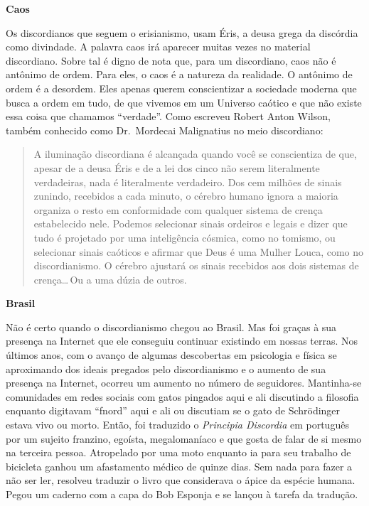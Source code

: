 \newpage
\begin{flushleft}
{\Large \textbf{Caos}}
\end{flushleft}

Os discordianos que seguem o erisianismo, usam Éris, a deusa grega da discórdia como divindade. A palavra caos irá aparecer muitas vezes no material discordiano. Sobre tal é dig\-no de nota que, para um discordiano, caos não é antônimo de ordem. Para eles, o caos é a natureza da realidade. O antônimo de ordem é a desordem. Eles apenas querem conscientizar a sociedade moderna que busca a ordem em tudo, de que vivemos em um Universo caótico e que não existe essa coisa que chamamos ``verdade''. Como escreveu Robert Anton Wilson, também conhecido como Dr.~Mordecai Malignatius no meio discordiano:

	\begin{quote}
	{\small
	A iluminação discordiana é alcançada quando você se conscientiza de que, apesar de a deusa Éris e de a lei dos cinco não serem literalmente verdadeiras, nada é literalmente verdadeiro. Dos cem milhões de sinais zunindo, recebidos a cada minuto, o cérebro humano ignora a maioria organiza o resto em conformidade com qualquer sistema de crença estabelecido nele. Podemos selecionar sinais ordeiros e legais e dizer que tudo é projetado por uma inteligência cósmica, como no tomismo, ou selecionar sinais caóticos e afirmar que Deus é uma Mulher Louca, como no discordianismo. O cérebro ajustará os sinais recebidos aos dois sistemas de crença\ldots\,Ou a uma dúzia de outros.}
	\end{quote}
 
\begin{flushleft}
{\Large \textbf{Brasil}}
\end{flushleft}

Não é certo quando o discordianismo chegou ao Brasil. Mas foi graças à sua presença na Internet que ele conseguiu continuar existindo em nossas terras. Nos últimos anos, com o avanço de algumas descobertas em psicologia e física se aproximando dos ideais pregados pelo discordianismo e o aumento de sua presença na Internet, ocorreu um aumento no número de seguidores.  Mantinha-se comunidades em redes sociais com gatos pingados aqui e ali discutindo a filosofia enquanto digitavam ``fnord'' aqui e ali ou discutiam se o gato de Schrödinger estava vivo ou morto. Então, foi traduzido o \emph{Principia Discordia} em português por um sujeito franzino, egoísta, megalomaníaco e que gosta de falar de si mesmo na terceira pessoa. Atropelado por uma moto enquanto ia para seu trabalho de bicicleta ganhou um afastamento médico de quinze dias. Sem nada para fazer a não ser ler, resolveu traduzir o livro que considerava o ápice da espécie humana. Pegou um caderno com a capa do Bob Esponja e se lançou à tarefa da tradução.

